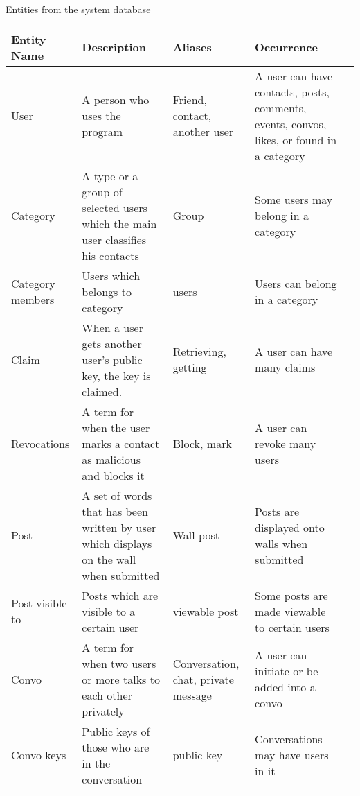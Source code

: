 
Entities from the system database
\begin{center}
    \begin{tabular}{| l | l | l | l | l |}
    \hline
    Entity Name      & Description                                                                                              & Aliases                             & Occurrence                                     \\ \hline
    User             & A person who uses the program                                                                            & Friend, contact, another user       & A user can have contacts, posts, comments, events, convos, likes, or found in a category                                              \\ \hline
    Category         & A type or a group of selected users which the main user classifies his contacts        & Group                               & Some users may belong in a category           \\ \hline
    Category members & Users which belongs to category                                                        & users                             &  Users can belong in a category          \\ \hline
    Claim            & When a user gets another user's public key, the key is claimed.                        & Retrieving, getting                 & A user can have many claims                   \\ \hline
    Revocations      & A term for when the user marks a contact as malicious and blocks it                    & Block, mark                         & A user can revoke many users                  \\ \hline
    Post             & A set of words that has been written by user which displays on the wall when submitted & Wall post                           & Posts are displayed onto walls when submitted \\ \hline
    Post visible to  & Posts which are visible to a certain user  & viewable post                             & Some posts are made viewable to certain users         \\ \hline
    Convo            & A term for when two users or more talks to each other privately                        & Conversation, chat, private message & A user can initiate or be added into a convo  \\ \hline
    Convo keys       & Public keys of those who are in the conversation                                       & public key                        & Conversations may have users in it       \\ \hline

\end{tabular}
\end{center}
